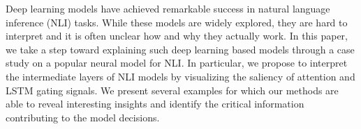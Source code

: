 Deep learning models have achieved remarkable success in natural language inference (NLI) tasks. While these models are widely explored, they are hard to interpret and it is often unclear how and why they actually work. In this paper, we take a step toward explaining such deep learning based models through a case study on a popular neural model for NLI. In particular, we propose to interpret the intermediate layers of NLI models by visualizing the saliency of attention and LSTM gating signals. We present several examples for which our methods are able to reveal interesting insights and identify the critical information contributing to the model decisions.
